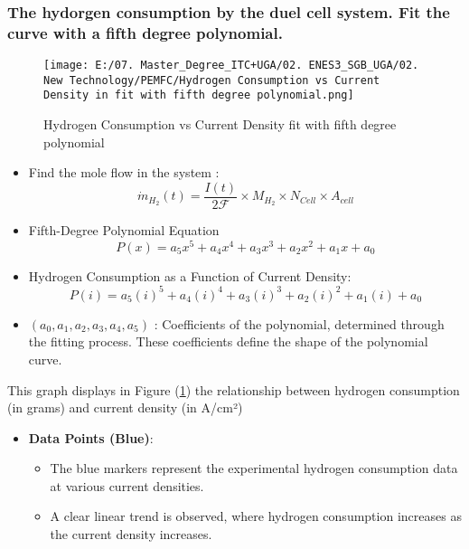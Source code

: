 \documentclass[12pt,a4paper]{article}
\numberwithin{equation}{section}
\begin{document}
{\subsubsection{The hydorgen consumption by the duel cell system. Fit the curve with a fifth degree polynomial.}
\begin{figure}[h]
	\centering 
	\texttt{[image: E:/07. Master\_Degree\_ITC+UGA/02. ENES3\_SGB\_UGA/02. New Technology/PEMFC/Hydrogen Consumption vs Current Density in fit with fifth degree polynomial.png]}
	\caption{\small {Hydrogen Consumption vs Current Density fit with fifth degree polynomial}}
	\label{17}
\end{figure}
\begin{itemize}
	\item Find the mole flow in the system : 
	\begin{equation}
		\dot{m}_{H_2}(t) = \frac{I(t)}{2\mathscr{F}}\times M_{H_2} \times N_{Cell} \times A_{cell} \label{eq2.7}
	\end{equation}

	\item Fifth-Degree Polynomial Equation
	\begin{equation}
		P(x) = a_5 x^5 + a_4 x^4 + a_3 x^3 + a_2 x^2 + a_1 x + a_0
	\end{equation}
	\item Hydrogen Consumption as a Function of Current Density:
	\begin{equation}
		P(i) = a_5 (i)^5 + a_4 (i)^4 + a_3 (i)^3 + a_2 (i)^2 + a_1 (i) + a_0
	\end{equation}
	\item $(a_0, a_1, a_2, a_3, a_4, a_5)$ : Coefficients of the polynomial, determined through the fitting process. These coefficients define the shape of the polynomial curve.
\end{itemize}
This graph displays in Figure (\ref{17}) the relationship between hydrogen consumption (in grams) and current density (in A/cm²)
\begin{itemize}
	\item \textbf{Data Points (Blue)}:
	\begin{itemize}
		\item The blue markers represent the experimental hydrogen consumption data at various current densities.
		\item A clear linear trend is observed, where hydrogen consumption increases as the current density increases.
	\end{itemize}
	

\end{itemize}}
\end{document}
